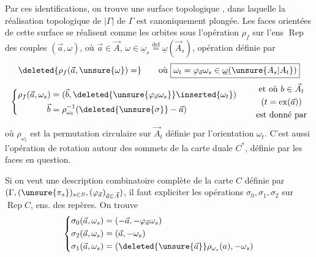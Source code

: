 
Par ces identifications, on trouve une surface topologique , dans laquelle la réalisation topologique de $|\Gamma|$ de $\Gamma$ est canoniquement plongée. Les faces orientées de cette surface se réalisent comme les orbites sous l'opération $\rho_f$ sur l'ens  $\operatorname{Rep}$ des couples $(\vec a,\omega)$, où $\vec a\in\vec A$, $\omega\in\underline\omega_s\overset{\mathrm{def}}=\underline\omega(\vec A_s)$, opération définie par
\[
\deleted{\rho_f(\vec a,\unsure{\omega})=}
\qquad\text{où }\boxed{\omega_t=\varphi_{\vec a}\omega_s\in\underline\omega(\unsure{A_s|A_t})}
\]
\[
\left\{\begin{aligned}
\rho_f(\vec a,\omega_s)&=(\vec b,\deleted{\unsure{\varphi_{\vec a}\omega_s}}\inserted{\omega_t})\\
\vec b&=\rho_{\omega_t}^{-1}(\deleted{\unsure{\sigma}}-\vec a)
\end{aligned}\right.
\qquad\begin{gathered}\text{et où }b\in\vec A_t\\(t=\operatorname{ex}(\vec a))\\\text{est donné par}\end{gathered}
\]
où $\rho_{\omega_t}$ est la permutation circulaire sur $\vec A_t$ définie par l'orientation $\omega_t$. C'est aussi l'opération de rotation autour des sommets de la carte duale $C^*$, définie par les faces en question.

Si on veut une description combinatoire complète de la carte $C$ définie par $(\Gamma,(\unsure{\pi_s})_{s\in S},(\varphi_{\vec a})_{\vec a\in\vec A})$, il faut expliciter les opérations $\sigma_0,\sigma_1,\sigma_2$ sur $\operatorname{Rep}C$, ens. des repères. On trouve
\[
\left\{\begin{aligned}
\sigma_0(\vec a,\omega_s)&=(-\vec a,-\varphi_{\vec a}\omega_s)\\
\sigma_2(\vec a,\omega_s)&=(\vec a,-\omega_s)\\
\sigma_1(\vec a,\omega_s)&=(\deleted{\unsure{\vec a}}\rho_{\omega_s}(a),-\omega_s)
\end{aligned}\right.
\]

